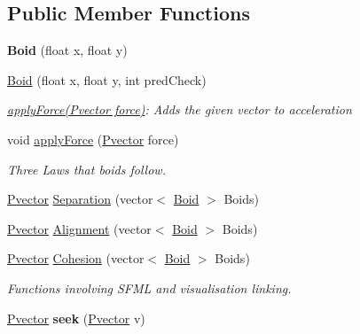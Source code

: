 \subsection*{Public Member Functions}
\begin{DoxyCompactItemize}
\item 
{\bfseries Boid} (float x, float y)\hypertarget{class_boid_a61c7081f12c16ba99dc4b3c094195bb2}{}\label{class_boid_a61c7081f12c16ba99dc4b3c094195bb2}

\item 
\hyperlink{class_boid_a22e47f71f5d635f788ff747cf69bdc55}{Boid} (float x, float y, int pred\+Check)\hypertarget{class_boid_a22e47f71f5d635f788ff747cf69bdc55}{}\label{class_boid_a22e47f71f5d635f788ff747cf69bdc55}

\begin{DoxyCompactList}\small\item\em \hyperlink{class_boid_acef10e100c27b76f6b867ae7468c09bb}{apply\+Force(\+Pvector force)}\+: Adds the given vector to acceleration \end{DoxyCompactList}\item 
void \hyperlink{class_boid_acef10e100c27b76f6b867ae7468c09bb}{apply\+Force} (\hyperlink{class_pvector}{Pvector} force)\hypertarget{class_boid_acef10e100c27b76f6b867ae7468c09bb}{}\label{class_boid_acef10e100c27b76f6b867ae7468c09bb}

\begin{DoxyCompactList}\small\item\em Three Laws that boids follow. \end{DoxyCompactList}\item 
\hyperlink{class_pvector}{Pvector} \hyperlink{class_boid_aa6910fba0e1edba1eac4c1ca234d1199}{Separation} (vector$<$ \hyperlink{class_boid}{Boid} $>$ Boids)
\item 
\hyperlink{class_pvector}{Pvector} \hyperlink{class_boid_ac1830d68d2af0eade8d26fc6084960aa}{Alignment} (vector$<$ \hyperlink{class_boid}{Boid} $>$ Boids)
\item 
\hyperlink{class_pvector}{Pvector} \hyperlink{class_boid_ae1f8d78202e983a11f1ee72e1de0473c}{Cohesion} (vector$<$ \hyperlink{class_boid}{Boid} $>$ Boids)
\begin{DoxyCompactList}\small\item\em Functions involving S\+F\+ML and visualisation linking. \end{DoxyCompactList}\item 
\hyperlink{class_pvector}{Pvector} {\bfseries seek} (\hyperlink{class_pvector}{Pvector} v)\hypertarget{class_boid_a3135a25087ac386d92e28b5718f6504f}{}\label{class_boid_a3135a25087ac386d92e28b5718f6504f}


\end{DoxyCompactItemize}
